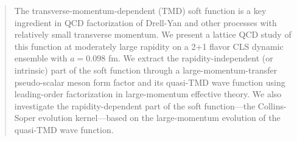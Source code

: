 \documentclass[11pt]{article}
\begin{document}
\addtocounter{footnote}{1}

\begin{abstract}
The transverse-momentum-dependent (TMD) soft function is a key ingredient in QCD factorization of
Drell-Yan and other processes with relatively small transverse momentum.
We present a lattice QCD study of this function at moderately large rapidity
on a 2+1 flavor CLS dynamic ensemble with $a=0.098$ fm. We extract the rapidity-independent (or intrinsic) part of the
soft function through a large-momentum-transfer pseudo-scalar
meson form factor and its quasi-TMD wave function using  leading-order factorization
in large-momentum effective theory.
%
We also investigate the rapidity-dependent part of the soft function---the Collins-Soper evolution kernel---based on the large-momentum evolution of the quasi-TMD wave function.
\end{abstract}







\end{document}
